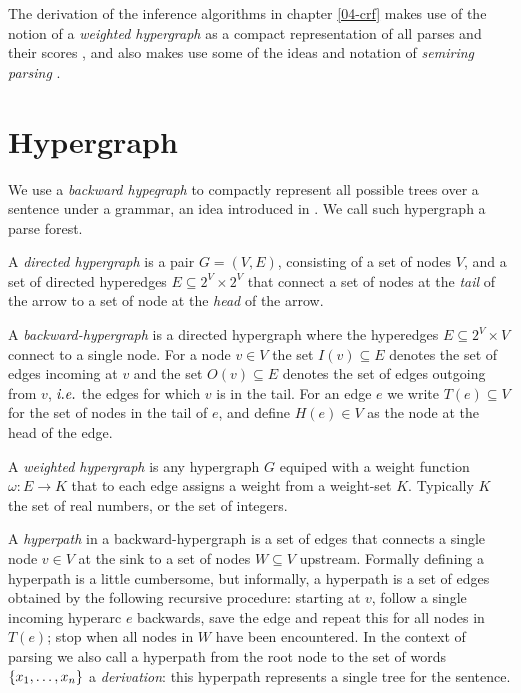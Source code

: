 % 

The derivation of the inference algorithms in chapter \ref{04-crf} makes use of the notion of a \textit{weighted hypergraph} as a compact representation of all parses and their scores \citep{gallo1993directed,klein2004parsing}, and also makes use some of the ideas and notation of \textit{semiring parsing} \citep{goodman1999semiring,eisner2009semirings}.

\section{Hypergraph}
  We use a \textit{backward hypegraph} to compactly represent all possible trees over a sentence under a grammar, an idea introduced in \citet{klein2004parsing}. We call such hypergraph a parse forest.

  \begin{definition}{}
    A \textit{directed hypergraph} is a pair $G = (V, E)$, consisting of a set of nodes $V$, and a set of directed hyperedges $E \subseteq 2^V \times 2^V$ that connect a set of nodes at the \textit{tail} of the arrow to a set of node at the \textit{head} of the arrow.
  \end{definition}

  \begin{definition}{}
    A \textit{backward-hypergraph} is a directed hypergraph where the hyperedges $E \subseteq 2^V \times V$ connect to a single node. For a node $v \in V$ the set $I(v) \subseteq E$ denotes the set of edges incoming at $v$ and the set $O(v) \subseteq E$ denotes the set of edges outgoing from $v$, $\emph{i.e.}$ the edges for which $v$ is in the tail. For an edge $e$ we write $T(e) \subseteq V$ for the set of nodes in the tail of $e$, and define $H(e) \in V$ as the node at the head of the edge.
  \end{definition}

  \begin{definition}{}
     A \textit{weighted hypergraph} is any hypergraph $G$ equiped with a weight function $\omega : E \to K$ that to each edge assigns a weight from a weight-set $K$. Typically $K$ the set of real numbers, or the set of integers.
  \end{definition}

  \begin{definition}{}
    A \textit{hyperpath} in a backward-hypergraph is a set of edges that connects a single node $v \in V$ at the sink to a set of nodes $W \subseteq V$ upstream. Formally defining a hyperpath is a little cumbersome, but informally, a hyperpath is a set of edges obtained by the following recursive procedure: starting at $v$, follow a single incoming hyperarc $e$ backwards, save the edge and repeat this for all nodes in $T(e)$; stop when all nodes in $W$ have been encountered. In the context of parsing we also call a hyperpath from the root node to the set of words $\{ x_1, \dots, x_n \}$ a \textit{derivation}: this hyperpath represents a single tree for the sentence.
  \end{definition}


